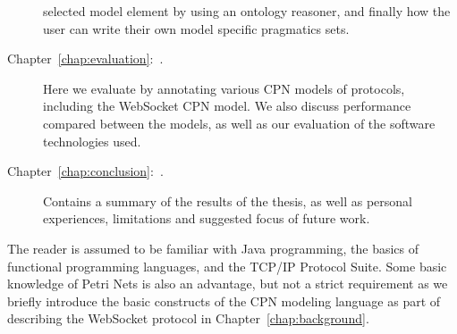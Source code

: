 \begin{description}
selected model element by using an ontology reasoner, and finally how the user
can write their own model specific pragmatics sets.
\item [Chapter~\ref{chap:evaluation}:~\nameref{chap:evaluation}.] Here we
evaluate \thename{} by annotating various CPN models of protocols, including
the WebSocket CPN model. We also discuss performance compared between the
models, as well as our evaluation of the software technologies used.
\item [Chapter~\ref{chap:conclusion}:~\nameref{chap:conclusion}.] Contains a
summary of the results of the thesis, as well as personal experiences,
limitations and suggested focus of future work.
\end{description} 


The reader is assumed to be familiar with Java programming, the basics of
functional programming languages, and the TCP/IP Protocol Suite. Some basic
knowledge of Petri Nets is also an advantage, but not a strict requirement as we
briefly introduce the basic constructs of the CPN modeling language as part of
describing the WebSocket protocol in Chapter~\ref{chap:background}.
